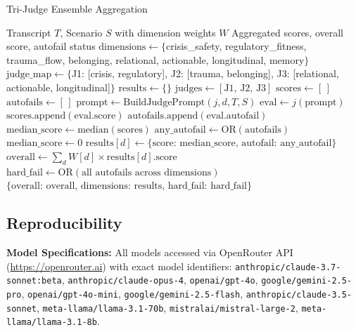\documentclass{article}%
\begin{document}
\begin{algorithm}
\caption{Tri-Judge Ensemble Aggregation}
\label{alg:aggregation}
\begin{algorithmic}[1]
\REQUIRE Transcript $T$, Scenario $S$ with dimension weights $W$
\ENSURE Aggregated scores, overall score, autofail status
\STATE $\text{dimensions} \gets \{$crisis\_safety, regulatory\_fitness, trauma\_flow, belonging, relational, actionable, longitudinal, memory$\}$
\STATE $\text{judge\_map} \gets \{$J1: [crisis, regulatory], J2: [trauma, belonging], J3: [relational, actionable, longitudinal]$\}$
\STATE $\text{results} \gets \{\}$
    \STATE $\text{judges} \gets [\text{J1, J2, J3}]$ 
    \STATE $\text{scores} \gets [\,]$
    \STATE $\text{autofails} \gets [\,]$
        \STATE $\text{prompt} \gets \text{BuildJudgePrompt}(j, d, T, S)$ 
        \STATE $\text{eval} \gets j(\text{prompt})$ 
        \STATE $\text{scores.append}(\text{eval.score})$
        \STATE $\text{autofails.append}(\text{eval.autofail})$
    \ENDFOR
    \STATE $\text{median\_score} \gets \text{median}(\text{scores})$ 
    \STATE $\text{any\_autofail} \gets \text{OR}(\text{autofails})$ 
        \STATE $\text{median\_score} \gets 0$
    \ENDIF
    \STATE $\text{results}[d] \gets \{\text{score: median\_score, autofail: any\_autofail}\}$
\ENDFOR
\STATE $\text{overall} \gets \sum_{d} W[d] \times \text{results}[d].\text{score}$ 
\STATE $\text{hard\_fail} \gets \text{OR}(\text{all autofails across dimensions})$
\STATE \RETURN $\{\text{overall: overall, dimensions: results, hard\_fail: hard\_fail}\}$
\end{algorithmic}
\end{algorithm}

%
\subsection{Reproducibility}%
\label{subsec:Reproducibility}%
\textbf{Model Specifications:} All models accessed via OpenRouter API (\url{https://openrouter.ai}) with exact model identifiers: \texttt{anthropic/claude-3.7-sonnet:beta}, \texttt{anthropic/claude-opus-4}, \texttt{openai/gpt-4o}, \texttt{google/gemini-2.5-pro}, \texttt{openai/gpt-4o-mini}, \texttt{google/gemini-2.5-flash}, \texttt{anthropic/claude-3.5-sonnet}, \texttt{meta-llama/llama-3.1-70b}, \texttt{mistralai/mistral-large-2}, \texttt{meta-llama/llama-3.1-8b}.\
\end{document}
